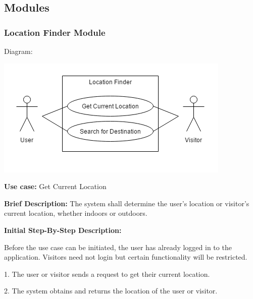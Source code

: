\documentclass{article}
\begin{document}
    \subsection{Modules}
    \subsubsection{Location Finder Module}
    Diagram:
    	
    \includegraphics[scale=.7]{LocationFinder}
    \begin{flushleft}
    \textbf{Use case:} Get Current Location
    \newline
    	
    \textbf{Brief Description:}
    \newline
    The system shall determine the user's location or visitor's 		current location, whether indoors or outdoors.
    \newline
    
    \textbf{Initial Step-By-Step Description:}
    
    Before the use case can be initiated, the user has already logged in to the application. Visitors need not login but certain functionality will be restricted.
	\newline    
	
1. The user or visitor sends a request to get their current location.
    
2. The system obtains and returns the location of the user or visitor.
\end{flushleft}
\end{document}
